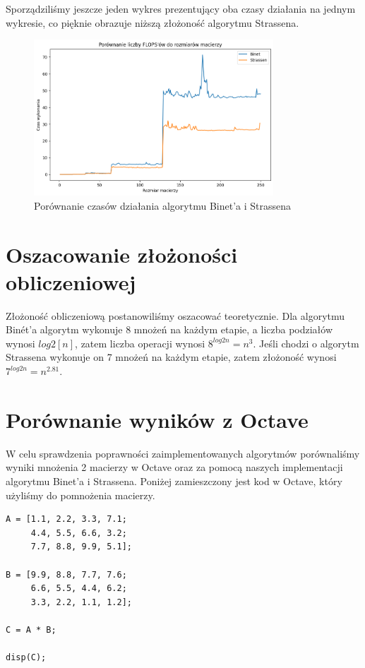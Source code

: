 \documentclass{article}
\begin{document}
\noindent
Sporządziliśmy jeszcze jeden wykres prezentujący oba czasy działania na jednym wykresie, co pięknie obrazuje niższą złożoność algorytmu Strassena.

\begin{figure}[H]
  \centering
    \includegraphics[width=0.8\textwidth]{images/binet_strassen_runtime.png}
  \caption{Porównanie czasów działania algorytmu Binet'a i Strassena}
\end{figure}

\section{Oszacowanie złożoności obliczeniowej}

Złożoność obliczeniową postanowiliśmy oszacować teoretycznie. Dla algorytmu Binét'a algorytm wykonuje 8 mnożeń na każdym etapie, a liczba podziałów wynosi \(log{2}[n]\), zatem liczba operacji wynosi \(8^{log{2}{n}} = n^3\). Jeśli chodzi o algorytm Strassena wykonuje on 7 mnożeń na każdym etapie, zatem złożoność wynosi \(7^{log{2}{n}} = n^{2.81}\).

\section{Porównanie wyników z Octave}

W celu sprawdzenia poprawności zaimplementowanych algorytmów porównaliśmy wyniki mnożenia 2 macierzy w Octave oraz za pomocą naszych implementacji algorytmu Binet'a i Strassena. Poniżej zamieszczony jest kod w Octave, który użyliśmy do pomnożenia macierzy.

\begin{verbatim}
A = [1.1, 2.2, 3.3, 7.1;
     4.4, 5.5, 6.6, 3.2;
     7.7, 8.8, 9.9, 5.1];

B = [9.9, 8.8, 7.7, 7.6;
     6.6, 5.5, 4.4, 6.2;
     3.3, 2.2, 1.1, 1.2];

C = A * B;

disp(C);
\end{verbatim}
\end{document}
